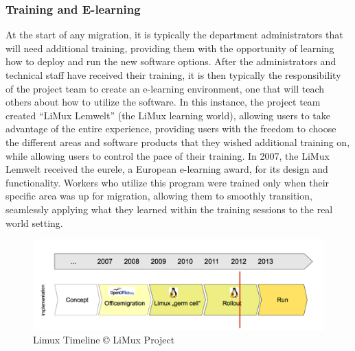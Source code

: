\subsubsection{Training and  E-learning }
At the start of any migration, it is typically the department administrators that will need additional training, providing them with the opportunity of learning how to deploy and run the new software options. After the administrators and technical staff have received their training, it is then typically the responsibility of the project team to create an e-learning environment, one that will teach others about how to utilize the software. In this instance, the project team created ``LiMux Lemwelt'' (the LiMux learning world), allowing users to take advantage of the entire experience, providing users with the freedom to choose the different areas and software products that they wished additional training on, while allowing users to control the pace of their training. In 2007, the LiMux Lemwelt received the eurele, a European e-learning award, for its design and functionality. Workers who utilize this program were trained only when their specific area was up for migration, allowing them to smoothly transition, seamlessly applying what they learned within the training sessions to the real world setting.
\begin{figure}[H]
    \includegraphics[scale=0.4]{img/timeline_limux.png}
 \caption  [Limux Timeline]{Limux Timeline © LiMux Project}  
\end{figure}
